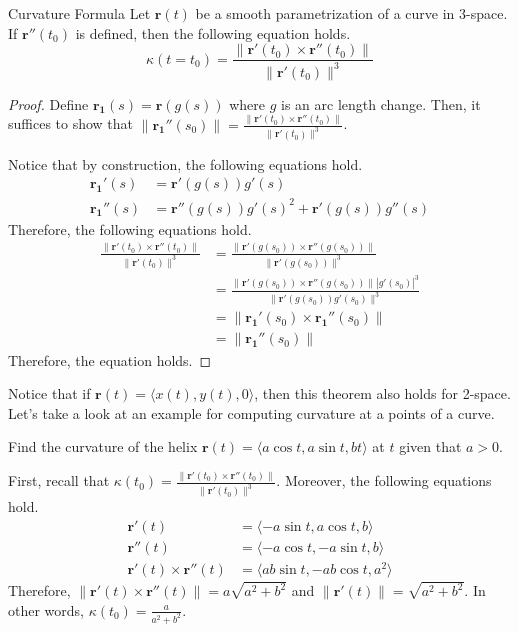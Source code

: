 \documentclass[../../../main.tex]{subfiles}
\begin{document}
\begin{theorem}{}{Curvature Formula}
Let $\mathbf{r}(t)$ be a smooth parametrization of a curve in 3-space.
If $\mathbf{r}''(t_0)$ is defined, then the following equation holds.
\[
\kappa(t = t_0)
= \frac{ \| \mathbf{r}'(t_0) \times \mathbf{r}''(t_0) \| }
    {\| \mathbf{r}'(t_0) \|^3}
\]
\end{theorem}
\begin{proof}
Define $\mathbf{r_1}(s) = \mathbf{r}(g(s))$ where $g$ is an arc length
change. Then, it suffices to show that $\| \mathbf{r_1}''(s_0) \| =
\frac{ \| \mathbf{r}'(t_0) \times \mathbf{r}''(t_0) \| }
{\| \mathbf{r}'(t_0) \|^3}$.

Notice that by construction, the following equations hold.
\begin{align*}
    \mathbf{r_1}'(s)
    &= \mathbf{r}'(g(s)) g'(s) \\
    \mathbf{r_1}''(s)
    &= \mathbf{r}''(g(s)) g'(s)^2 + \mathbf{r}'(g(s)) g''(s)
\end{align*}
Therefore, the following equations hold.
\begin{align*}
    \frac{ \| \mathbf{r}'(t_0) \times \mathbf{r}''(t_0) \| }
        {\| \mathbf{r}'(t_0) \|^3}
    &= \frac{ \| \mathbf{r}'(g(s_0)) \times \mathbf{r}''(g(s_0)) \| }
        {\| \mathbf{r}'(g(s_0)) \|^3} \\
    &= \frac{
        \| \mathbf{r}'(g(s_0)) \times \mathbf{r}''(g(s_0)) \|
        | g'(s_0) |^3
    }{\| \mathbf{r}'(g(s_0)) g'(s_0) \|^3} \\
    &= \| \mathbf{r_1}'(s_0) \times \mathbf{r_1}''(s_0) \| \\
    &= \| \mathbf{r_1}''(s_0) \|
\end{align*}
Therefore, the equation holds.
\end{proof}

Notice that if $\mathbf{r}(t) = \langle x(t), y(t), 0 \rangle$,
then this theorem also holds for 2-space. Let's take a look at an
example for computing curvature at a points of a curve.

\begin{problem}{}{}
Find the curvature of the helix $\mathbf{r}(t) = \langle a \cos t,
a \sin t, bt \rangle$ at $t$ given that $a > 0$.
\end{problem}
\begin{solution}
First, recall that $\kappa(t_0) = \frac{ \| \mathbf{r}'(t_0) \times
\mathbf{r}''(t_0) \| }{\| \mathbf{r}'(t_0) \|^3}$. Moreover,
the following equations hold.
\begin{align*}
    \mathbf{r}'(t) &= \langle -a \sin t, a \cos t, b \rangle \\
    \mathbf{r}''(t) &= \langle -a \cos t, -a \sin t, b \rangle \\
    \mathbf{r}'(t) \times \mathbf{r}''(t)
    &= \langle ab \sin t, - ab \cos t, a^2 \rangle
\end{align*}
Therefore, $\| \mathbf{r}'(t) \times \mathbf{r}''(t) \| =
a \sqrt{a^2 + b^2}$ and $\| \mathbf{r}'(t) \| = \sqrt{a^2 + b^2}$.
In other words, $\kappa(t_0) = \frac{a}{a^2 + b^2}$.
\end{solution}
\end{document}
